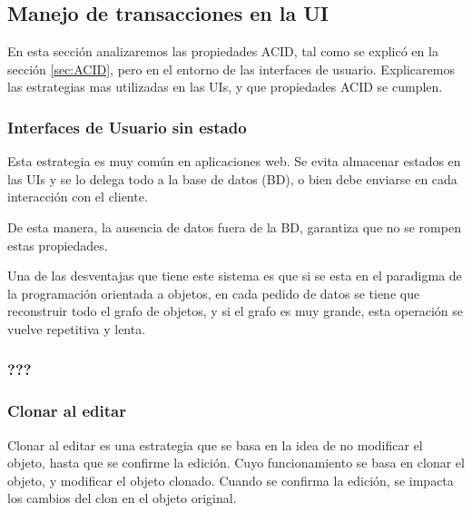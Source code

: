 		



\subsection{Manejo de transacciones en la UI}

	En esta sección analizaremos las propiedades ACID, tal como se
	explicó en la sección \ref{sec:ACID},  pero en el entorno de las interfaces
	de usuario.
	Explicaremos las estrategias mas utilizadas en las UIs, y que propiedades ACID
	se cumplen.


	\subsubsection{Interfaces de Usuario sin estado}
		Esta estrategia es muy común en aplicaciones web. Se evita almacenar estados
		en las UIs y se lo delega todo a la base de datos (BD), o bien debe enviarse
		en cada interacción con el cliente.
		
		De esta manera, la	ausencia de datos fuera de la BD, garantiza que no se
		rompen estas propiedades.
		
		Una de las desventajas que tiene este sistema es que si se esta en el
		paradigma de la programación orientada a objetos, en cada pedido de datos
		se tiene que reconstruir todo el grafo de objetos, y si el grafo es muy grande,
		esta operación se vuelve repetitiva y lenta.
		
		
	\subsubsection{???}
	
	
	\subsubsection{Clonar al editar}
	
		Clonar al editar es una estrategia que se basa en la idea de no modificar el
		objeto, hasta que se confirme la edición. Cuyo funcionamiento se basa en 
		clonar el objeto, y modificar el objeto clonado. Cuando se confirma la
		edición, se impacta los cambios del clon en el objeto original.
		
